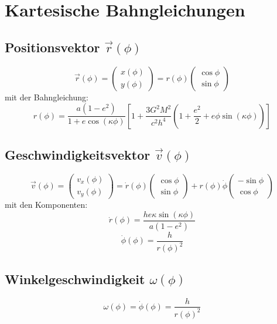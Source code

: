 \section{Kartesische Bahngleichungen}
\subsection{Positionsvektor $\vec{r}(\phi)$}
\[ 
\vec{r}(\phi) = \begin{pmatrix}
x(\phi) \\
y(\phi)
\end{pmatrix} =
r(\phi) \begin{pmatrix}
\cos\phi \\
\sin\phi
\end{pmatrix}
\]
mit der Bahngleichung:
\[
r(\phi) = \frac{a(1-e^2)}{1 + e\cos(\kappa \phi)} \left[1 + \frac{3G^2M^2}{c^2 h^4}\left(1 + \frac{e^2}{2} + e\phi \sin(\kappa \phi)\right)\right]
\]

\subsection{Geschwindigkeitsvektor $\vec{v}(\phi)$}
\[
\vec{v}(\phi) = \begin{pmatrix}
v_x(\phi) \\
v_y(\phi)
\end{pmatrix} =
\dot{r}(\phi) \begin{pmatrix}
\cos\phi \\
\sin\phi
\end{pmatrix} +
r(\phi)\dot{\phi} \begin{pmatrix}
-\sin\phi \\
\cos\phi
\end{pmatrix}
\]
mit den Komponenten:
\[
\dot{r}(\phi) = \frac{h e \kappa \sin(\kappa \phi)}{a(1 - e^2)}
\]
\[
\dot{\phi}(\phi) = \frac{h}{r(\phi)^2}
\]

\subsection{Winkelgeschwindigkeit $\omega(\phi)$}
\[
\omega(\phi) = \dot{\phi}(\phi) = \frac{h}{r(\phi)^2}
\]